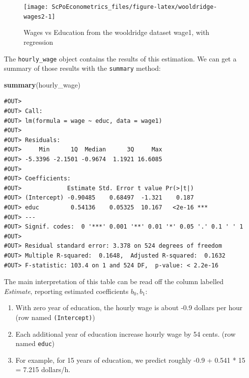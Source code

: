 \documentclass[]{book}
\newenvironment{Shaded}{\begin{snugshade}}{\end{snugshade}}
\newcommand{\KeywordTok}[1]{\textcolor[rgb]{0.13,0.29,0.53}{\textbf{#1}}}
\newcommand{\NormalTok}[1]{#1}
\providecommand{\tightlist}{%
  \setlength{\itemsep}{0pt}\setlength{\parskip}{0pt}}
\begin{document}
\begin{figure}

{\centering \texttt{[image: ScPoEconometrics\_files/figure-latex/wooldridge-wages2-1]} 

}

\caption{Wages vs Education from the wooldridge dataset wage1, with regression}\label{fig:wooldridge-wages2}
\end{figure}

The \texttt{hourly\_wage} object contains the results of this estimation. We can get a summary of those results with the \texttt{summary} method:

\begin{Shaded}
\begin{Highlighting}[]
\KeywordTok{summary}\NormalTok{(hourly_wage)}
\end{Highlighting}
\end{Shaded}

\begin{verbatim}
#OUT> 
#OUT> Call:
#OUT> lm(formula = wage ~ educ, data = wage1)
#OUT> 
#OUT> Residuals:
#OUT>     Min      1Q  Median      3Q     Max 
#OUT> -5.3396 -2.1501 -0.9674  1.1921 16.6085 
#OUT> 
#OUT> Coefficients:
#OUT>             Estimate Std. Error t value Pr(>|t|)    
#OUT> (Intercept) -0.90485    0.68497  -1.321    0.187    
#OUT> educ         0.54136    0.05325  10.167   <2e-16 ***
#OUT> ---
#OUT> Signif. codes:  0 '***' 0.001 '**' 0.01 '*' 0.05 '.' 0.1 ' ' 1
#OUT> 
#OUT> Residual standard error: 3.378 on 524 degrees of freedom
#OUT> Multiple R-squared:  0.1648,  Adjusted R-squared:  0.1632 
#OUT> F-statistic: 103.4 on 1 and 524 DF,  p-value: < 2.2e-16
\end{verbatim}

The main interpretation of this table can be read off the column labelled \emph{Estimate}, reporting estimated coefficients \(b_0,b_1\):

\begin{enumerate}
\def\labelenumi{\arabic{enumi}.}
\tightlist
\item
  With zero year of education, the hourly wage is about -0.9 dollars per hour (row named \texttt{(Intercept)})
\item
  Each additional year of education increase hourly wage by 54 cents. (row named \texttt{educ})
\item
  For example, for 15 years of education, we predict roughly -0.9 + 0.541 * 15 = 7.215 dollars/h.
\end{enumerate}
\end{document}
